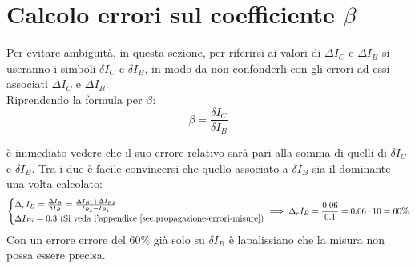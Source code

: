 \documentclass[../main.tex]{subfiles}
\begin{document}
\section{Calcolo errori sul coefficiente $\beta$}
  \label{sec:errori-beta}
  Per evitare ambiguità, in questa sezione, per riferirsi ai valori
  di $\varDelta I_C$ e $\varDelta I_B$ si useranno i simboli
  $\delta I_C$ e $\delta I_B$, in modo da non confonderli con gli
  errori ad essi associati $\Delta I_C$ e $\Delta I_B$.\\

  \noindent Riprendendo la formula per $\beta$:
  \begin{equation*}
    \beta = \frac{\delta I_C}{\delta I_B}
  \end{equation*}

  è immediato vedere che il suo errore relativo sarà pari alla somma
  di quelli di $\delta I_C$ e $\delta I_B$.
  Tra i due è facile convincersi che quello associato a
  $\delta I_B$ sia il dominante una volta calcolato:
  \begin{equation*}
    \left\{
    \begin{array}{@{}l@{}}
      \Delta_r I_B = \frac{\Delta I_B}{\delta I_B} = \frac{\Delta I_{B1} + \Delta I_{B2}}{I_{B_2} - I_{B_1}} \\[1ex]
      \Delta I_{Bi} = 0.3 \text{ (Si veda l'appendice~\ref{sec:propagazione-errori-misure})}
    \end{array}\right. \implies
    \Delta_r I_B = \frac{0.06}{0.1} = 0.06 \cdot 10 = 60\%
  \end{equation*}
  Con un errore errore del 60\% già solo su $\delta I_B$ è
  lapalissiano che la misura non possa essere precisa.
\end{document}
